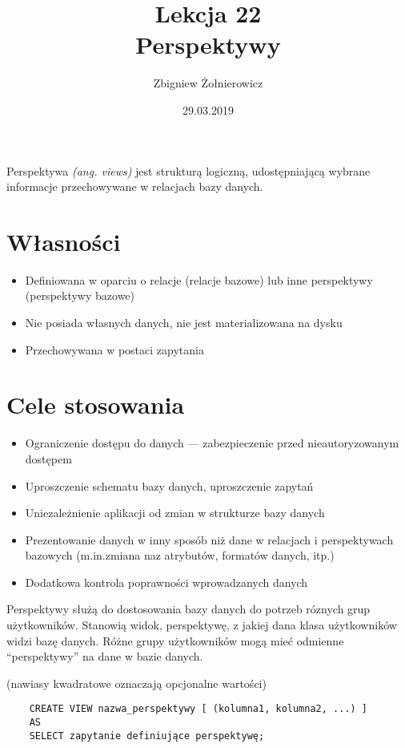 \documentclass{article}
\begin{document}
\title{{\huge Lekcja 22} \\
{\large Perspektywy}}
\author{Zbigniew Żołnierowicz}
\date{29.03.2019}
\maketitle
Perspektywa \emph{(ang. views)} jest strukturą logiczną, udostępniającą wybrane informacje przechowywane w relacjach bazy danych.

\section{Własności}

\begin{itemize}
    \item Definiowana w oparciu o relacje (relacje bazowe) lub inne perspektywy (perspektywy bazowe)
    \item Nie posiada własnych danych, nie jest materializowana na dysku
    \item Przechowywana w postaci zapytania
\end{itemize}

\section{Cele stosowania}

\begin{itemize}
    \item Ograniczenie dostępu do danych --- zabezpieczenie przed nieautoryzowanym dostępem
    \item Uproszczenie schematu bazy danych, uproszczenie zapytań
    \item Uniezależnienie aplikacji od zmian w strukturze bazy danych
    \item Prezentowanie danych w inny sposób niż dane w relacjach i perspektywach bazowych (m.in.\@ zmiana naz atrybutów, formatów danych, itp.)
    \item Dodatkowa kontrola poprawności wprowadzanych danych
\end{itemize}

Perspektywy służą do dostosowania bazy danych do potrzeb róznych grup użytkowników.
Stanowią widok, perspektywę, z jakiej dana klasa użytkowników widzi bazę danych.
Różne grupy użytkowników mogą mieć odmienne ``perspektywy'' na dane w bazie danych.
\pagebreak

(nawiasy kwadratowe oznaczają opcjonalne wartości)

\begin{verbatim}
    CREATE VIEW nazwa_perspektywy [ (kolumna1, kolumna2, ...) ]
    AS
    SELECT zapytanie definiujące perspektywę;
\end{verbatim}
\end{document}
